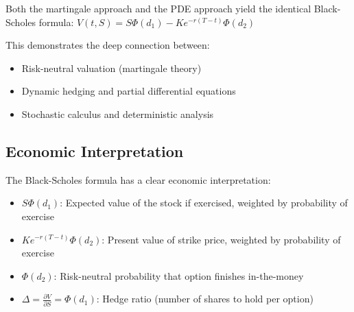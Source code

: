 \documentclass[
  letterpaper,
  DIV=11,
  numbers=noendperiod]{scrartcl}
\providecommand{\tightlist}{%
  \setlength{\itemsep}{0pt}\setlength{\parskip}{0pt}}\usepackage{longtable,booktabs,array}
\begin{document}
\begin{tcolorbox}[enhanced jigsaw, colback=white, rightrule=.15mm, coltitle=black, left=2mm, colframe=quarto-callout-important-color-frame, breakable, arc=.35mm, bottomtitle=1mm, toptitle=1mm, titlerule=0mm, leftrule=.75mm, colbacktitle=quarto-callout-important-color!10!white, title={Theorem 5.1 (Equivalence of Both Methods)}, toprule=.15mm, opacitybacktitle=0.6, bottomrule=.15mm, opacityback=0]

Both the martingale approach and the PDE approach yield the identical
Black-Scholes formula:
\(V(t,S) = S \Phi(d_1) - K e^{-r(T-t)} \Phi(d_2)\)

This demonstrates the deep connection between:

\begin{itemize}
\tightlist
\item
  Risk-neutral valuation (martingale theory)
\item
  Dynamic hedging and partial differential equations\\
\item
  Stochastic calculus and deterministic analysis
\end{itemize}

\end{tcolorbox}

\hypertarget{economic-interpretation}{%
\subsection{Economic Interpretation}\label{economic-interpretation}}

\begin{tcolorbox}[enhanced jigsaw, colback=white, rightrule=.15mm, coltitle=black, left=2mm, colframe=quarto-callout-tip-color-frame, breakable, arc=.35mm, bottomtitle=1mm, toptitle=1mm, titlerule=0mm, leftrule=.75mm, colbacktitle=quarto-callout-tip-color!10!white, title={Remark 5.1 (Economic Interpretation)}, toprule=.15mm, opacitybacktitle=0.6, bottomrule=.15mm, opacityback=0]

The Black-Scholes formula has a clear economic interpretation:

\begin{itemize}
\tightlist
\item
  \(S \Phi(d_1)\): Expected value of the stock if exercised, weighted by
  probability of exercise
\item
  \(K e^{-r(T-t)} \Phi(d_2)\): Present value of strike price, weighted
  by probability of exercise\\
\item
  \(\Phi(d_2)\): Risk-neutral probability that option finishes
  in-the-money
\item
  \(\Delta = \frac{\partial V}{\partial S} = \Phi(d_1)\): Hedge ratio
  (number of shares to hold per option)
\end{itemize}

\end{tcolorbox}
\end{document}
